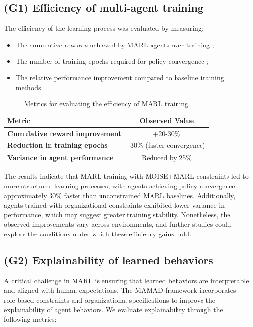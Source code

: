 \documentclass[pdflatex,sn-mathphys-num]{sn-jnl}%
\theoremstyle{thmstyleone}%
\theoremstyle{thmstyletwo}%
\theoremstyle{thmstylethree}%
\begin{document}
\subsection{(G1) Efficiency of multi-agent training}

The efficiency of the learning process was evaluated by measuring:
\begin{itemize}
    \item The cumulative rewards achieved by MARL agents over training ;
    \item The number of training epochs required for policy convergence ;
    \item The relative performance improvement compared to baseline training methods.
\end{itemize}

\begin{table}[h!]
    \centering
    \caption{Metrics for evaluating the efficiency of MARL training}
    \begin{tabular}{|l|c|}
        \hline
        \textbf{Metric} & \textbf{Observed Value} \\
        \hline
        \textbf{Cumulative reward improvement} & +20-30\% \\
        \hline
        \textbf{Reduction in training epochs} & -30\% (faster convergence) \\
        \hline
        \textbf{Variance in agent performance} & Reduced by 25\% \\
        \hline
    \end{tabular}
    \label{tab:efficiency}
\end{table}

The results indicate that MARL training with MOISE+MARL constraints led to more structured learning processes, with agents achieving policy convergence approximately 30\% faster than unconstrained MARL baselines. Additionally, agents trained with organizational constraints exhibited lower variance in performance, which may suggest greater training stability. Nonetheless, the observed improvements vary across environments, and further studies could explore the conditions under which these efficiency gains hold.

\subsection{(G2) Explainability of learned behaviors}

A critical challenge in MARL is ensuring that learned behaviors are interpretable and aligned with human expectations. The MAMAD framework incorporates role-based constraints and organizational specifications to improve the explainability of agent behaviors. We evaluate explainability through the following metrics:
\end{document}

